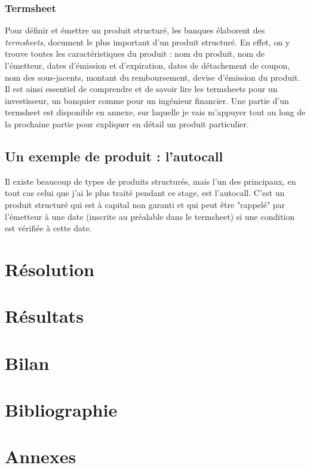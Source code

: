 \documentclass[11pt,a4paper]{article}
\begin{document}
\subsubsection{Termsheet}
Pour définir et émettre un produit structuré, les banques élaborent des \textit{termsheets}, document le plus important d'un produit structuré. En effet, on y trouve toutes les caractéristiques du produit : nom du produit, nom de l'émetteur, dates d'émission et d'expiration, dates de détachement de coupon, nom des sous-jacents, montant du remboursement, devise d'émission du produit. Il est ainsi essentiel de comprendre et de savoir lire les termsheets pour un investisseur, un banquier comme pour un ingénieur financier. Une partie d'un termsheet est disponible en annexe, sur laquelle je vais m'appuyer tout au long de la prochaine partie pour expliquer en détail un produit particulier.

\subsection{Un exemple de produit : l'autocall}
Il existe beaucoup de types de produits structurés, mais l'un des principaux, en tout cas celui que j'ai le plus traité pendant ce stage, est l'autocall. C'est un produit structuré qui est à capital non garanti et qui peut être "rappelé" par l'émetteur à une date (inscrite au préalable dans le termsheet) si une condition est vérifiée à cette date.





\newpage
\section{Résolution}
\newpage
\section{Résultats}
\newpage
\section{Bilan}
\newpage
\section{Bibliographie}



\newpage

\section{Annexes}


\newpage
\printglossaries
\end{document}
